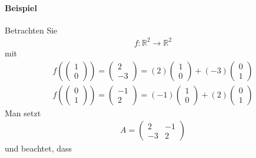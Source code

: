 \documentclass[11pt]{report}
\newcommand*\Zb[1] {\mathbb{#1}}
\begin{document}
\paragraph{Beispiel}
Betrachten Sie 
\begin{align}
 f: \Zb{R}^2 \rightarrow \Zb{R}^2
\end{align}
mit
\begin{align}
 f(\begin{pmatrix} 1 \\ 0\end{pmatrix}) = \begin{pmatrix} 2 \\ -3\end{pmatrix} = (2) \begin{pmatrix} 1 \\ 0 \end{pmatrix} + (-3) \begin{pmatrix} 0 \\ 1\end{pmatrix} \\
 f(\begin{pmatrix} 0 \\ 1\end{pmatrix}) = \begin{pmatrix} -1 \\ 2 \end{pmatrix} = (-1) \begin{pmatrix} 1 \\ 0 \end{pmatrix} + (2) \begin{pmatrix} 0 \\ 1 \end{pmatrix}
\end{align}
Man setzt
\begin{align}
 A = \begin{pmatrix} 2 & -1 \\ -3 & 2\end{pmatrix}
\end{align}
und beachtet, dass
\end{document}
